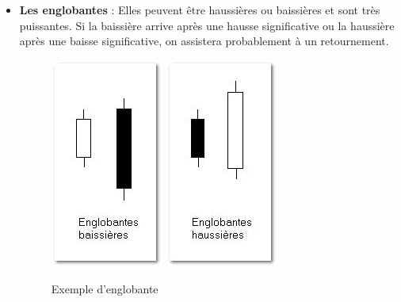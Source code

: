 \begin{itemize}
\item \textbf{Les englobantes} : Elles peuvent être haussières ou baissières et sont très puissantes. Si la baissière arrive après une hausse significative ou la haussière après une baisse significative, on assistera probablement à un retournement.
\begin{figure}[H]
  \center
  \includegraphics[scale=0.5]{../graph/chandelier5.png}
  \includegraphics[scale=0.5]{../graph/chandelier6.png}
  \caption{Exemple d'englobante}
\end{figure} 


\end{itemize}
